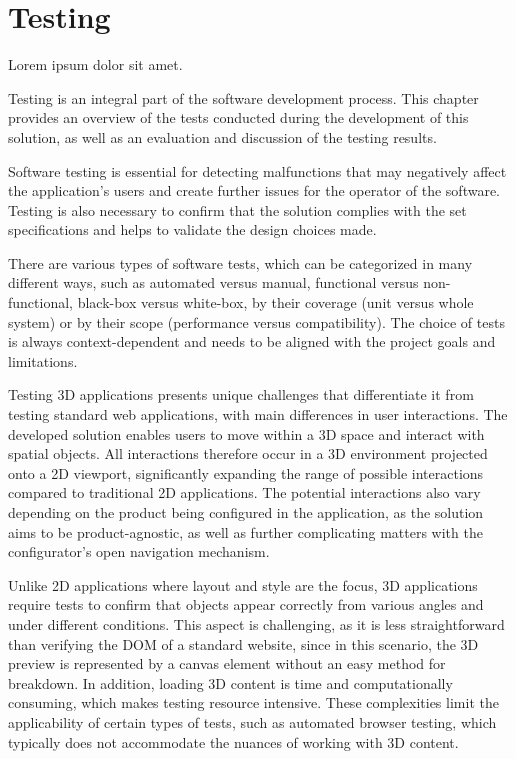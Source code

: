\chapter{Testing}

\begin{chapterabstract}
    Lorem ipsum dolor sit amet.
\end{chapterabstract}

Testing is an integral part of the software development process. This chapter provides an overview of the tests conducted during the development of this solution, as well as an evaluation and discussion of the testing results.

Software testing is essential for detecting malfunctions that may negatively affect the application's users and create further issues for the operator of the software. Testing is also necessary to confirm that the solution complies with the set specifications and helps to validate the design choices made. \cite{Homes2012}

There are various types of software tests, which can be categorized in many different ways, such as automated versus manual, functional versus non-functional, black-box versus white-box, by their coverage (unit versus whole system) or by their scope (performance versus compatibility). The choice of tests is always context-dependent and needs to be aligned with the project goals and limitations. \cite{Krysik2023}

Testing 3D applications presents unique challenges that differentiate it from testing standard web applications, with main differences in user interactions. The developed solution enables users to move within a 3D space and interact with spatial objects. All interactions therefore occur in a 3D environment projected onto a 2D viewport, significantly expanding the range of possible interactions compared to traditional 2D applications. The potential interactions also vary depending on the product being configured in the application, as the solution aims to be product-agnostic, as well as further complicating matters with the configurator's open navigation mechanism.

Unlike 2D applications where layout and style are the focus, 3D applications require tests to confirm that objects appear correctly from various angles and under different conditions. This aspect is challenging, as it is less straightforward than verifying the DOM of a standard website, since in this scenario, the 3D preview is represented by a canvas element without an easy method for breakdown. In addition, loading 3D content is time and computationally consuming, which makes testing resource intensive. These complexities limit the applicability of certain types of tests, such as automated browser testing, which typically does not accommodate the nuances of working with 3D content.

